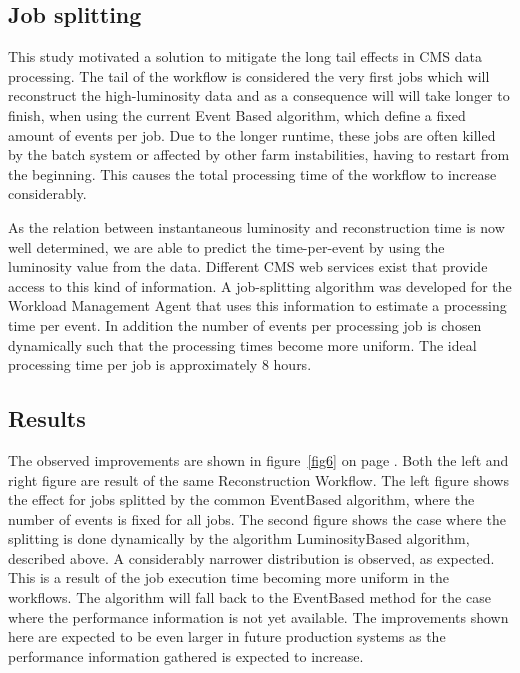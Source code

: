 \documentclass[a4paper]{jpconf}
\begin{document}
\subsection{Job splitting}

This study motivated a solution to mitigate the long tail effects in CMS data processing. The tail of the workflow is considered the very first jobs which will reconstruct the high-luminosity data and as a consequence will will take longer to finish, when using the current Event Based algorithm, which define a fixed amount of events per job. Due to the longer runtime, these jobs are often killed by the batch system or affected by other farm instabilities, having to restart from the beginning. This causes the total processing time of the workflow to increase considerably.

As the relation between instantaneous luminosity and reconstruction time is now well determined, we are able to predict the time-per-event by using the luminosity value from the data. Different CMS web services exist that provide access to this kind of information.  A job-splitting algorithm was developed for the Workload Management Agent that uses this information to estimate a processing time per event. In addition the number of events per processing job is chosen dynamically such that the processing times become more uniform. The ideal processing time per job is approximately 8 hours.


\subsection{Results}

The observed improvements are shown in figure~\ref{fig6} on page \pageref{fig6}. Both the left and right figure are result of the same Reconstruction Workflow. The left figure shows the effect for jobs splitted by the common EventBased algorithm, where the number of events is fixed for all jobs. The second figure shows the case where the splitting is done dynamically by the algorithm LuminosityBased algorithm, described above. A considerably narrower distribution is observed, as expected. This is a result of the job execution time becoming more uniform in the workflows. The algorithm will fall back to the EventBased method for the case where the performance information is not yet available. The improvements shown here are expected to be even larger in future production systems as the performance information gathered is expected to increase.
\end{document}

